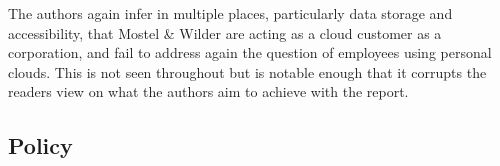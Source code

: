 \documentclass[12pt, oneside]{article}
\begin{document}
The authors again infer in multiple places, particularly data storage and accessibility, that Mostel & Wilder are acting as a cloud customer as a corporation, and fail to address again the question of employees using personal clouds. This is not seen throughout but is notable enough that it corrupts the readers view on what the authors aim to achieve with the report. 
\subsection*{Policy}
\end{document}
